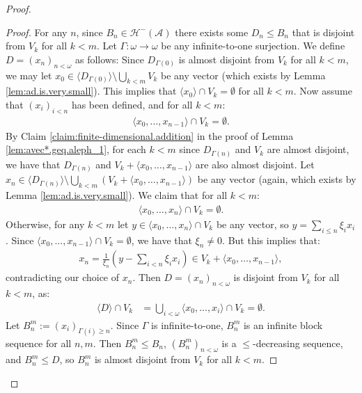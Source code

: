 \documentclass[11pt,reqno]{amsart}
\theoremstyle{plain}
\numberwithin{equation}{section}
\theoremstyle{definition}
\renewcommand{\c}[1]{\langle #1 \rangle}
\newcommand{\bb}[1]{\left( #1 \right)}
\newcommand{\cal}{\mathcal}
\newcommand{\A}{\cal{A}}
\renewcommand{\H}{\cal{H}}
\newenvironment{midproof}[1][Proof]
  {\begin{proof}[#1]\renewcommand{\qedsymbol}{$\blacksquare$}}
  {\end{proof}}
\begin{document}
\begin{proof}
    \begin{midproof}
        For any $n$, since $B_n \in \H^-(\A)$ there exists some $D_n \leq B_n$ that is disjoint from $V_k$ for all $k < m$. Let $\Gamma : \omega \to \omega$ be any infinite-to-one surjection. We define $D = (x_n)_{n<\omega}$ as follows: Since $D_{\Gamma(0)}$ is almost disjoint from $V_k$ for all $k < m$, we may let $x_0 \in \c{D_{\Gamma(0)}} \setminus \bigcup_{k<m} V_k$ be any vector (which exists by Lemma \ref{lem:ad.is.very.small}). This implies that $\c{x_0} \cap V_k = \emptyset$ for all $k < m$. Now assume that $(x_i)_{i<n}$ has been defined, and for all $k < m$:
        \begin{align*}
            \c{x_0,\dots,x_{n-1}} \cap V_k = \emptyset.
        \end{align*}
        By Claim \ref{claim:finite-dimensional.addition} in the proof of Lemma \ref{lem:avec*.geq.aleph_1}, for each $k < m$ since $D_{\Gamma(n)}$ and $V_k$ are almost disjoint, we have that $D_{\Gamma(n)}$ and $V_k + \c{x_0,\dots,x_{n-1}}$ are also almost disjoint. Let $x_n \in \c{D_{\Gamma(n)}} \setminus \bigcup_{k<m} (V_k + \c{x_0,\dots,x_{n-1}})$ be any vector (again, which exists by Lemma \ref{lem:ad.is.very.small}). We claim that for all $k < m$:
        \begin{align*}
            \c{x_0,\dots,x_n} \cap V_k = \emptyset.
        \end{align*}
        Otherwise, for any $k < m$ let $y \in \c{x_0,\dots,x_n} \cap V_k$ be any vector, so $y = \sum_{i \leq n} \xi_i x_i$. Since $\c{x_0,\dots,x_{n-1}} \cap V_k = \emptyset$, we have that $\xi_n \neq 0$. But this implies that:
        \begin{align*}
            x_n = \frac{1}{\xi_n}\bb{y - \sum_{i<n} \xi_ix_i} \in V_k + \c{x_0,\dots,x_{n-1}},
        \end{align*}
        contradicting our choice of $x_n$. Then $D = (x_n)_{n<\omega}$ is disjoint from $V_k$ for all $k < m$, as:
        \begin{align*}
            \c{D} \cap V_k &= \bigcup_{i<\omega} \c{x_0,\dots,x_i} \cap V_k = \emptyset.
        \end{align*}
        Let $B_n^m := (x_i)_{\Gamma(i) \geq n}$. Since $\Gamma$ is infinite-to-one, $B_n^m$ is an infinite block sequence for all $n,m$. Then $B_n^m \leq B_n$, $(B_n^m)_{n<\omega}$ is a $\leq$-decreasing sequence, and $B_n^m \leq D$, so $B_n^m$ is almost disjoint from $V_k$ for all $k < m$. 
    \end{midproof}
    

\end{proof}
\end{document}
